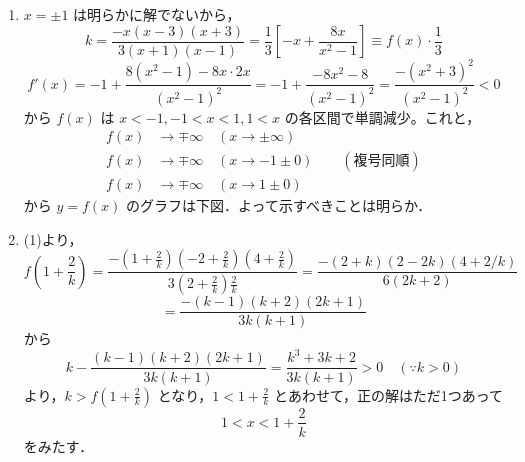 \documentclass[../main.tex]{subfiles}
\begin{document}
\noindent
[\textbf{解}]
\begin{enumerate}
  \item[(1)] $x = \pm 1$ は明らかに解でないから，
    \[
      k = \frac{-x(x-3)(x+3)}{3(x+1)(x-1)} = \frac{1}{3}\left[ -x + \frac{8x}{x^2-1} \right] \equiv f(x) \cdot \frac{1}{3}
    \]
    \[
      f'(x) = -1 + \frac{8(x^2-1) - 8x \cdot 2x}{(x^2-1)^2} = -1 + \frac{-8x^2-8}{(x^2-1)^2} = \frac{-(x^2+3)^2}{(x^2-1)^2} < 0
    \]
    から $f(x)$ は $x < -1, -1 < x < 1, 1 < x$ の各区間で単調減少。これと，
    \[
      \begin{aligned}
        f(x) &\longrightarrow \mp \infty \quad (x \to \pm \infty) \\
        f(x) &\longrightarrow \mp \infty \quad (x \to -1 \pm 0) \qquad (\text{複号同順}) \\
        f(x) &\longrightarrow \mp \infty \quad (x \to 1 \pm 0)
      \end{aligned}
    \]
    から $y=f(x)$ のグラフは下図．よって示すべきことは明らか．

    \begin{center}
    \end{center}

  \item[(2)] (1)より，
    \[
      f\left(1+\frac{2}{k}\right) = \frac{-\left(1+\frac{2}{k}\right)\left(-2+\frac{2}{k}\right)\left(4+\frac{2}{k}\right)}{3\left(2+\frac{2}{k}\right)\frac{2}{k}} = \frac{-(2+k)(2-2k)(4+2/k)}{6(2k+2)}
    \]
    \[
      = \frac{-(k-1)(k+2)(2k+1)}{3k(k+1)}
    \]
    から
    \[
      k - \frac{(k-1)(k+2)(2k+1)}{3k(k+1)} = \frac{k^3+3k+2}{3k(k+1)} > 0 \quad (\because k > 0)
    \]
    より，$k > f\left(1+\frac{2}{k}\right)$ となり，$1 < 1+\frac{2}{k}$ とあわせて，正の解はただ1つあって
    \[
      1 < x < 1 + \frac{2}{k}
    \]
    をみたす．
\end{enumerate}
\end{document}
